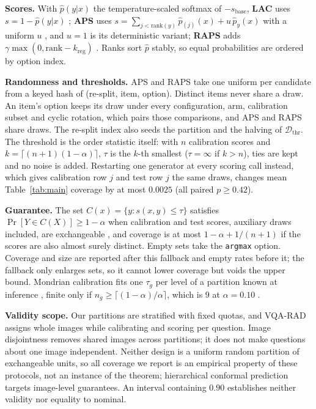 \documentclass[a4paper,conference]{IEEEtran}
\newcommand{\Dthr}{\mathcal{D}_{\mathrm{thr}}}
\newcommand{\sbase}{s_{\mathrm{base}}}
\newcommand{\rtag}[1]{}
\begin{document}
\textbf{Scores.} With $\hat p(y|x)$ the temperature-scaled softmax of
$-\sbase$, \textbf{LAC} uses $s=1-\hat p(y|x)$ \cite{sadinle2019least};
\textbf{APS} uses $s=\sum_{j<\mathrm{rank}(y)}\hat p_{(j)}(x)+u\,\hat p_y(x)$
with a uniform $u$ \cite{romano2020classification}, and $u=1$ is its
deterministic variant; \textbf{RAPS} adds
$\gamma\max(0,\mathrm{rank}-k_{\mathrm{reg}})$ \cite{angelopoulos2021uncertainty}.
Ranks sort $\hat p$ stably, so equal probabilities are ordered by option index.

\textbf{Randomness and thresholds.} APS and RAPS take one uniform per
candidate from a keyed hash of (re-split, item, option). Distinct items never
share a draw.\rtag{C2} An item's option keeps its draw under every configuration, arm,
calibration subset and cyclic rotation, which pairs those comparisons, and APS
and RAPS share draws. The re-split index also seeds the partition and the
halving of $\Dthr$. The threshold is the order statistic itself: with $n$
calibration scores and $k=\lceil(n+1)(1-\alpha)\rceil$, $\tau$ is the $k$-th
smallest ($\tau=\infty$ if $k>n$), ties are kept and no noise is added.\rtag{C3}
Restarting one generator at every scoring call instead, which gives calibration
row $j$ and test row $j$ the same draws, changes mean Table~\ref{tab:main}
coverage by at most $0.0025$ (all paired $p\ge0.42$).

\textbf{Guarantee.} The set $C(x)=\{y:s(x,y)\le\tau\}$ satisfies
$\Pr[Y\in C(X)]\ge1-\alpha$ when calibration and test scores, auxiliary draws
included, are exchangeable \cite{vovk2005algorithmic,lei2018distribution}, and
coverage is at most $1-\alpha+1/(n+1)$ if the scores are also almost surely
distinct. Empty sets take the \texttt{argmax} option. Coverage and size are
reported after this fallback and empty rates before it; the fallback only
enlarges sets, so it cannot lower coverage but voids the upper bound. Mondrian
calibration fits one $\tau_g$ per level of a partition known at inference
\cite{vovk2003mondrian}, finite only if $n_g\ge\lceil(1-\alpha)/\alpha\rceil$,
which is $9$ at $\alpha=0.10$ \cite{ding2023class}.

\textbf{Validity scope.} Our partitions are stratified with fixed quotas, and
VQA-RAD assigns whole images while calibrating and scoring per question. Image
disjointness removes shared images across partitions; it does not make
questions about one image independent. Neither design is a uniform random
partition of exchangeable units, so all coverage we report is an empirical
property of these protocols, not an instance of the theorem; hierarchical
conformal prediction \cite{dunn2023hierarchical} targets image-level
guarantees. An interval containing $0.90$ establishes neither validity nor
equality to nominal.\rtag{R2.6}
\end{document}
